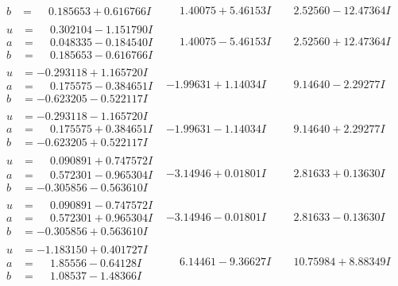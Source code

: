 \documentclass[1p]{elsarticle_modified}
\theoremstyle{definition}
\begin{document}
$$\begin{array}{c|c|c}
\begin{aligned}
b &= \phantom{-}0.185653 + 0.616766 I\end{aligned}
 & \phantom{-}1.40075 + 5.46153 I & \phantom{-}2.52560 - 12.47364 I \\ \hline\begin{aligned}
u &= \phantom{-}0.302104 - 1.151790 I \\
a &= \phantom{-}0.048335 - 0.184540 I \\
b &= \phantom{-}0.185653 - 0.616766 I\end{aligned}
 & \phantom{-}1.40075 - 5.46153 I & \phantom{-}2.52560 + 12.47364 I \\ \hline\begin{aligned}
u &= -0.293118 + 1.165720 I \\
a &= \phantom{-}0.175575 - 0.384651 I \\
b &= -0.623205 - 0.522117 I\end{aligned}
 & -1.99631 + 1.14034 I & \phantom{-}9.14640 - 2.29277 I \\ \hline\begin{aligned}
u &= -0.293118 - 1.165720 I \\
a &= \phantom{-}0.175575 + 0.384651 I \\
b &= -0.623205 + 0.522117 I\end{aligned}
 & -1.99631 - 1.14034 I & \phantom{-}9.14640 + 2.29277 I \\ \hline\begin{aligned}
u &= \phantom{-}0.090891 + 0.747572 I \\
a &= \phantom{-}0.572301 - 0.965304 I \\
b &= -0.305856 - 0.563610 I\end{aligned}
 & -3.14946 + 0.01801 I & \phantom{-}2.81633 + 0.13630 I \\ \hline\begin{aligned}
u &= \phantom{-}0.090891 - 0.747572 I \\
a &= \phantom{-}0.572301 + 0.965304 I \\
b &= -0.305856 + 0.563610 I\end{aligned}
 & -3.14946 - 0.01801 I & \phantom{-}2.81633 - 0.13630 I \\ \hline\begin{aligned}
u &= -1.183150 + 0.401727 I \\
a &= \phantom{-}1.85556 - 0.64128 I \\
b &= \phantom{-}1.08537 - 1.48366 I\end{aligned}
 & \phantom{-}6.14461 - 9.36627 I & \phantom{-}10.75984 + 8.88349 I \\ \hline\begin{aligned}

\end{aligned}
\end{array}$$
\end{document}
